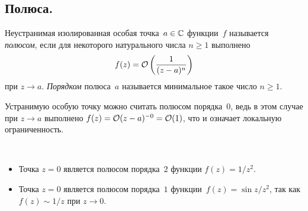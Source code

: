 \documentclass[../complex-analysis.tex]{subfiles}
\begin{document}
\subsection{Полюса.}

\begin{df}[полюс]
 Неустранимая изолированная особая точка~$ a\in\mathbb{C} $ функции~$ f $ называется \emph{полюсом}, если для некоторого натурального числа $ n \geqslant 1 $ выполнено
 \begin{align*}
  f(z) = \mathcal{O} \left( \frac{1}{(z-a)^{n}} \right)
 \end{align*} при $ z \to a $. \emph{Порядком} полюса~$ a $ называется минимальное такое число $ n \geqslant 1 $.
\end{df}

Устранимую особую точку можно считать полюсом порядка~$ 0 $, ведь в этом случае при $ z \to a $ выполнено $ f(z) = \mathcal{O} (z-a)^{-0} = \mathcal{O}(1) $, что и означает локальную ограниченность.

\begin{exmpl}\
 \begin{itemize}
  \item Точка $ z=0 $ является полюсом порядка~$ 2 $ функции $ f(z) =  1/z^{2} $.
  \item Точка $ z = 0 $ является полюсом порядка~$ 1 $ функции~$ f(z) = \sin z / z^{2} $, так как $ f(z) \sim 1 / z $ при $ z \to 0 $.
 \end{itemize}
\end{exmpl}
\end{document}

